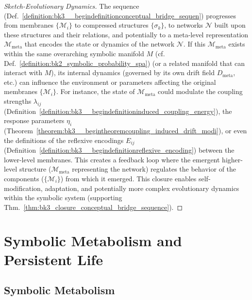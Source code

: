 \begin{proof}[Sketch-Evolutionary Dynamics]
\label{proof:bk3_sketch_evolutionary_dynamics}
The sequence (Def.~\ref{definition:bk3__begindefinitionconceptual_bridge_sequen}) progresses from membranes $\{\mathcal{M}_i\}$ to compressed structures $\{\sigma_k\}$, to networks $\mathcal{N}$ built upon these structures and their relations, and potentially to a meta-level representation $\mathcal{M}_{\text{meta}}$ that encodes the state or dynamics of the network $\mathcal{N}$. If this $\mathcal{M}_{\text{meta}}$ exists within the same overarching symbolic manifold $M$ (cf. Def.~\ref{definition:bk2_symbolic_probability_spa}) (or a related manifold that can interact with $M$), its internal dynamics (governed by its own drift field $D_{\text{meta}}$, etc.) can influence the environment or parameters affecting the original membranes $\{\mathcal{M}_i\}$. For instance, the state of $\mathcal{M}_{\text{meta}}$ could modulate the coupling strengths $\lambda_{ij}$ (Definition~\ref{definition:bk3__begindefinitioninduced_coupling_energy}), the response parameters $\eta_i$ (Theorem~\ref{theorem:bk3__begintheoremcoupling_induced_drift_modi}), or even the definitions of the reflexive encodings $E_{ij}$ (Definition~\ref{definition:bk3__begindefinitionreflexive_encoding}) between the lower-level membranes. This creates a feedback loop where the emergent higher-level structure ($\mathcal{M}_{\text{meta}}$ representing the network) regulates the behavior of the components ($\{\mathcal{M}_i\}$) from which it emerged. This closure enables self-modification, adaptation, and potentially more complex evolutionary dynamics within the symbolic system (supporting Thm.~\ref{thm:bk3_closure_conceptual_bridge_sequence}).
\end{proof}

\section{Symbolic Metabolism and Persistent Life} \label{sec:bk3_symbolic_metabolism_persistent_life}
\subsection{Symbolic Metabolism}

